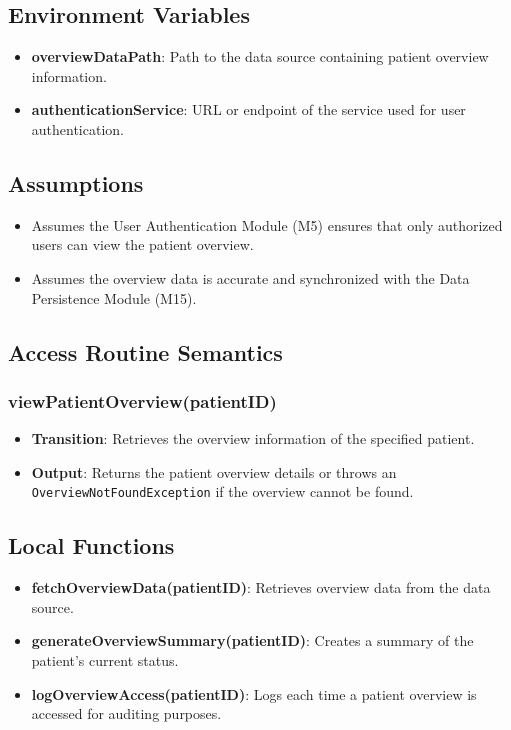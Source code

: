 \documentclass[12pt, titlepage]{article}
\begin{document}
\subsection{Environment Variables}
\begin{itemize}
\item \textbf{overviewDataPath}: Path to the data source containing patient overview information.
\item \textbf{authenticationService}: URL or endpoint of the service used for user authentication.
\end{itemize}

\subsection{Assumptions}
\begin{itemize}
\item Assumes the User Authentication Module (M5) ensures that only authorized users can view the patient overview.
\item Assumes the overview data is accurate and synchronized with the Data Persistence Module (M15).
\end{itemize}

\subsection{Access Routine Semantics}
\subsubsection{viewPatientOverview(patientID)}
\begin{itemize}
    \item \textbf{Transition}: Retrieves the overview information of the specified patient.
    \item \textbf{Output}: Returns the patient overview details or throws an \texttt{OverviewNotFoundException} if the overview cannot be found.
\end{itemize}

\subsection{Local Functions}
\begin{itemize}
\item \textbf{fetchOverviewData(patientID)}: Retrieves overview data from the data source.
\item \textbf{generateOverviewSummary(patientID)}: Creates a summary of the patient's current status.
\item \textbf{logOverviewAccess(patientID)}: Logs each time a patient overview is accessed for auditing purposes.
\end{itemize}
\end{document}
